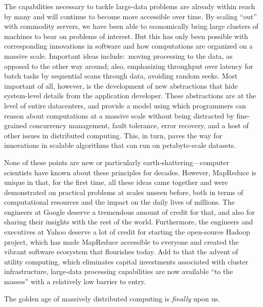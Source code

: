 The capabilities necessary to tackle large-data problems are already
within reach by many and will continue to become more accessible over
time.  By scaling ``out'' with commodity servers, we have been able to
economically bring large clusters of machines to bear on problems of
interest.  But this has only been possible with corresponding
innovations in software and how computations are organized on a
massive scale.  Important ideas include:\ moving processing to the
data, as opposed to the other way around; also, emphasizing throughput
over latency for batch tasks by sequential scans through data,
avoiding random seeks.  Most important of all, however, is the
development of new abstractions that hide system-level details from
the application developer.  These abstractions are at the level of
entire datacenters, and provide a model using which programmers can
reason about computations at a massive scale without being distracted
by fine-grained concurrency management, fault tolerance, error
recovery, and a host of other issues in distributed computing.  This,
in turn, paves the way for innovations in scalable algorithms that can
run on petabyte-scale datasets.

None of these points are new or particularly
earth-shattering---computer scientists have known about these
principles for decades.  However, MapReduce is unique in that, for the
first time, all these ideas came together and were demonstrated on
practical problems at scales unseen before, both in terms of
computational resources and the impact on the daily lives of millions.
The engineers at Google deserve a tremendous amount of credit for
that, and also for sharing their insights with the rest of the world.
Furthermore, the engineers and executives at Yahoo deserve a lot of
credit for starting the open-source Hadoop project, which has made
MapReduce accessible to everyone and created the vibrant software
ecosystem that flourishes today.  Add to that the advent of utility
computing, which eliminates capital investments associated with
cluster infrastructure, large-data processing capabilities are now
available ``to the masses'' with a relatively low barrier to entry.

The golden age of massively distributed computing is {\it finally}
upon us.

